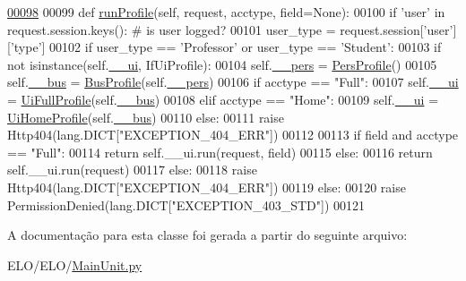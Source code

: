 \begin{DoxyCode}
\hypertarget{classELO_1_1MainUnit_1_1Factory_l00098}{}\hyperlink{classELO_1_1MainUnit_1_1Factory_ab20a76f74180fc77c6b8fcd8de7942f1}{00098} 
00099     \textcolor{keyword}{def }\hyperlink{classELO_1_1MainUnit_1_1Factory_ab20a76f74180fc77c6b8fcd8de7942f1}{runProfile}(self, request, acctype, field=None):
00100         \textcolor{keywordflow}{if} \textcolor{stringliteral}{'user'} \textcolor{keywordflow}{in} request.session.keys(): \textcolor{comment}{# is user logged?}
00101             user\_type = request.session[\textcolor{stringliteral}{'user'}][\textcolor{stringliteral}{'type'}]
00102             \textcolor{keywordflow}{if} user\_type == \textcolor{stringliteral}{'Professor'} \textcolor{keywordflow}{or} user\_type == \textcolor{stringliteral}{'Student'}:
00103                 \textcolor{keywordflow}{if} \textcolor{keywordflow}{not} isinstance(self.\hyperlink{classELO_1_1MainUnit_1_1Factory_a189a44a11e1a66ba69663eb2c598dd7c}{\_\_ui}, IfUiProfile):
00104                     self.\hyperlink{classELO_1_1MainUnit_1_1Factory_a68f6640ad3b515e1b8cd48d1554c0779}{\_\_pers} = \hyperlink{classProfile_1_1ProfileUnit_1_1PersProfile}{PersProfile}()
00105                     self.\hyperlink{classELO_1_1MainUnit_1_1Factory_a6a0b7b93046e095779ba54e0a8a4d02c}{\_\_bus} = \hyperlink{classProfile_1_1ProfileUnit_1_1BusProfile}{BusProfile}(self.\hyperlink{classELO_1_1MainUnit_1_1Factory_a68f6640ad3b515e1b8cd48d1554c0779}{\_\_pers})
00106                 \textcolor{keywordflow}{if} acctype == \textcolor{stringliteral}{"Full"}:
00107                     self.\hyperlink{classELO_1_1MainUnit_1_1Factory_a189a44a11e1a66ba69663eb2c598dd7c}{\_\_ui} = \hyperlink{classProfile_1_1ProfileUnit_1_1UiFullProfile}{UiFullProfile}(self.\hyperlink{classELO_1_1MainUnit_1_1Factory_a6a0b7b93046e095779ba54e0a8a4d02c}{\_\_bus})
00108                 \textcolor{keywordflow}{elif} acctype == \textcolor{stringliteral}{"Home"}:
00109                     self.\hyperlink{classELO_1_1MainUnit_1_1Factory_a189a44a11e1a66ba69663eb2c598dd7c}{\_\_ui} = \hyperlink{classProfile_1_1ProfileUnit_1_1UiHomeProfile}{UiHomeProfile}(self.\hyperlink{classELO_1_1MainUnit_1_1Factory_a6a0b7b93046e095779ba54e0a8a4d02c}{\_\_bus})
00110                 \textcolor{keywordflow}{else}:
00111                     \textcolor{keywordflow}{raise} Http404(lang.DICT[\textcolor{stringliteral}{"EXCEPTION\_404\_ERR"}])
00112             
00113                 \textcolor{keywordflow}{if} field \textcolor{keywordflow}{and} acctype == \textcolor{stringliteral}{"Full"}:
00114                     \textcolor{keywordflow}{return} self.\_\_ui.run(request, field)
00115                 \textcolor{keywordflow}{else}:
00116                     \textcolor{keywordflow}{return} self.\_\_ui.run(request)
00117             \textcolor{keywordflow}{else}:
00118                 \textcolor{keywordflow}{raise} Http404(lang.DICT[\textcolor{stringliteral}{"EXCEPTION\_404\_ERR"}])
00119         \textcolor{keywordflow}{else}:
00120             \textcolor{keywordflow}{raise} PermissionDenied(lang.DICT[\textcolor{stringliteral}{"EXCEPTION\_403\_STD"}])
00121         

\end{DoxyCode}


A documentação para esta classe foi gerada a partir do seguinte arquivo\-:\begin{DoxyCompactItemize}
\item 
E\-L\-O/\-E\-L\-O/\hyperlink{MainUnit_8py}{Main\-Unit.\-py}\end{DoxyCompactItemize}
